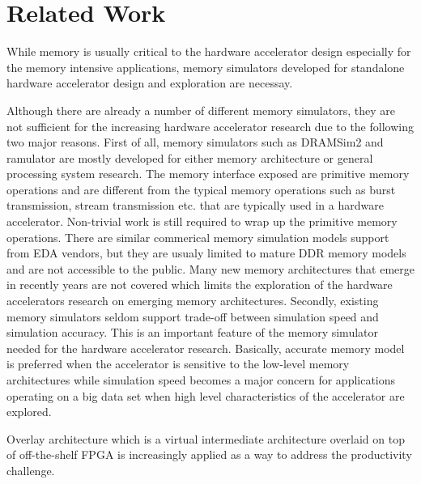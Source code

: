 \section{Related Work} \label{sec:relatedwork}

While memory is usually critical to the hardware accelerator design especially for the memory intensive applications, memory simulators developed for standalone hardware accelerator design and exploration are necessay. 

Although there are already a number of different memory simulators, they are not sufficient for the increasing hardware accelerator research due to the following two major reasons. First of all, memory simulators such as DRAMSim2 and ramulator are mostly developed for either memory architecture or general processing system research. The memory interface exposed are primitive memory operations and are different from the typical memory operations such as burst transmission, stream transmission etc. that are typically used in a hardware accelerator. Non-trivial work is still required to wrap up the primitive memory operations. There are similar commerical memory simulation models support from EDA vendors, but they are usualy limited to mature DDR memory models and are not accessible to the public. Many new memory architectures that emerge in recently years are not covered which limits the exploration of the hardware accelerators research on emerging memory architectures. Secondly, existing memory simulators seldom support trade-off between simulation speed and simulation accuracy. This is an important feature of the memory simulator needed for the hardware accelerator research. Basically, accurate memory model is preferred when the accelerator is sensitive to the low-level memory architectures while simulation speed becomes a major concern for applications operating on a big data set when high level characteristics of the accelerator are explored. 



Overlay architecture which is a virtual intermediate architecture overlaid on 
top of off-the-shelf FPGA is increasingly applied as a way to address the 
productivity challenge. 

